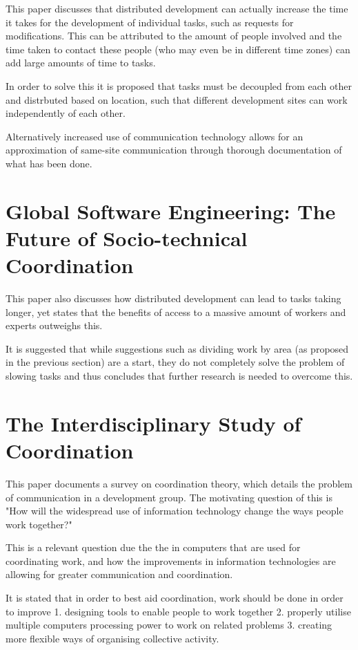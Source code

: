 \documentclass{l4proj}
\begin{document}
This paper discusses that distributed development can actually increase the time it takes for the development of individual tasks, such as requests for modifications.  This can be attributed to the amount of people involved and the time taken to contact these people (who may even be in different time zones) can add large amounts of time to tasks.  

In order to solve this it is proposed that tasks must be decoupled from each other and distrbuted based on location, such that different development sites can work independently of each other.

Alternatively increased use of communication technology allows for an approximation of same-site communication through thorough documentation of what has been done.

\section {Global Software Engineering: The Future of Socio-technical Coordination}

This paper also discusses how distributed development can lead to tasks taking longer, yet states that the benefits of access to a massive amount of workers and experts outweighs this.

It is suggested that while suggestions such as dividing work by area (as proposed in the previous section) are a start, they do not completely solve the problem of slowing tasks and thus concludes that further research is needed to overcome this.


\section {The Interdisciplinary Study of Coordination}

This paper documents a survey on coordination theory, which details the problem of communication in a development group.  The motivating question of this is "How will the widespread use of information technology change the ways people work together?"

This is a relevant question due the the in computers that are used for coordinating work, and how the improvements in information technologies are allowing for greater communication and coordination.

It is stated that in order to best aid coordination, work should be done in order to improve
1. designing tools to enable people to work together
2. properly utilise multiple computers processing power to work on related problems
3. creating more flexible ways of organising collective activity.
\end{document}
